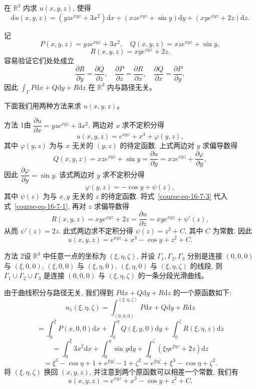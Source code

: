 \documentclass[UTF8,12pt,a4paper,fontset=fandol]{ctexart}
\begin{document}
\begin{example}\label{course-example-16-7-3}\quad 在 $\mathbb R^3$ 内求 $u(x,y,z)$, 使得
\[
  \mathrm du(x,y,z)=(yze^{xyz}+3x^2)\mathrm dx+(xze^{xyz}+\sin y)\mathrm dy+(xye^{xyz}+2z)\mathrm dz.
\]

\end{example}
\begin{solve}\quad 记
\[
  P(x,y,z)=yze^{xyz}+3x^2,\quad Q(x,y,z)=xze^{xyz}+\sin y,
\]
\[
  R(x,y,z)=xye^{xyz}+2z.
\]
容易验证它们处处成立
\[
  \frac{\partial R}{\partial y}=\frac{\partial Q}{\partial z},\quad
  \frac{\partial P}{\partial z}=\frac{\partial R}{\partial x},\quad
  \frac{\partial Q}{\partial x}=\frac{\partial P}{\partial y},
\]
因此 $\int_\Gamma P\mathrm dx+Q\mathrm dy+R\mathrm dz$ 在 $\mathbb R^3$ 内与路径无关。

下面我们用两种方法来求 $u(x,y,z)$。

方法 1\quad 由 $\dfrac{\partial u}{\partial x}=yze^{xyz}+3x^2$, 两边对 $x$ 求不定积分得
\begin{equation}
  u(x,y,z)=e^{xyz}+x^3+\varphi(y,z),
  \label{course-eq-16-7-1}
\end{equation}
其中 $\varphi(y,z)$ 为与 $x$ 无关的 $(y,z)$ 的待定函数. 上式两边对 $y$ 求偏导数得
\begin{equation}
  Q(x,y,z)=xze^{xyz}+\sin y
  =\frac{\partial u}{\partial y}
  =xze^{xyz}+\frac{\partial\varphi}{\partial y},
  \label{course-eq-16-7-2}
\end{equation}
因此 $\dfrac{\partial\varphi}{\partial y}=\sin y$. 该式两边对 $y$ 求不定积分得
\begin{equation}
  \varphi(y,z)=-\cos y+\psi(z),
  \label{course-eq-16-7-3}
\end{equation}
其中 $\psi(z)$ 为与 $x,y$ 无关的 $z$ 的待定函数. 将式~\eqref{course-eq-16-7-3}  代入式~\eqref{course-eq-16-7-1}, 再对 $z$ 求偏导数得
\[
  R(x,y,z)=xye^{xyz}+2z=\frac{\partial u}{\partial z}=xye^{xyz}+\psi'(z),
\]
从而 $\psi'(z)=2z$. 此式两边求不定积分得 $\psi(z)=z^2+C$, 其中 $C$ 为常数. 因此
\[
  u(x,y,z)=e^{xyz}+x^3-\cos y+z^2+C.
\]

方法 2\quad 设 $\mathbb R^3$ 中任意一点的坐标为 $(\xi,\eta,\zeta)$, 并设 $\Gamma_1,\Gamma_2,\Gamma_3$ 分别是连接 $(0,0,0)$ 与 $(\xi,0,0)$, $(\xi,0,0)$ 与 $(\xi,\eta,0)$, $(\xi,\eta,0)$ 与 $(\xi,\eta,\zeta)$ 的线段, 则 $\Gamma_1\cup\Gamma_2\cup\Gamma_3$ 是连接 $(0,0,0)$ 与 $(\xi,\eta,\zeta)$ 的一条分段光滑曲线。

由于曲线积分与路径无关, 我们得到 $P\mathrm dx+Q\mathrm dy+R\mathrm dz$ 的一个原函数如下:
\[
  u_1(\xi,\eta,\zeta)
  =\int_{(0,0,0)}^{(\xi,\eta,\zeta)}P\mathrm dx+Q\mathrm dy+R\mathrm dz
\]
\[
  =\int_0^\xi P(x,0,0)\mathrm dx
  +\int_0^\eta Q(\xi,y,0)\mathrm dy
  +\int_0^\zeta R(\xi,\eta,z)\mathrm dz
\]
\[
  =\int_0^\xi 3x^2\mathrm dx+\int_0^\eta\sin y\mathrm dy
  +\int_0^\zeta(\xi\eta e^{\xi\eta z}+2z)\mathrm dz
\]
\[
  =\xi^3-\cos\eta+1+e^{\xi\eta\zeta}-1+\zeta^2
  =e^{\xi\eta\zeta}+\xi^3-\cos\eta+\zeta^2.
\]
将 $(\xi,\eta,\zeta)$ 换回 $(x,y,z)$, 并注意到两个原函数可以相差一个常数, 我们有
\[
  u(x,y,z)=e^{xyz}+x^3-\cos y+z^2+C.
\]

\end{solve}
\end{document}
